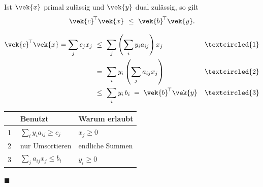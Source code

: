 \begin{merksatz}
Ist $\vek{x}$ primal zulässig und $\vek{y}$ dual zulässig, so gilt
\[ \vek{c}^{\!\top}\vek{x} \ \le\ \vek{b}^{\!\top}\vek{y} . \]

\begin{align*}
\vek{c}^{\!\top}\vek{x} = \sum_j c_j x_j
&\ \le\ \sum_j\left(\sum_i y_i a_{ij}\right)x_j && \textcircled{1}\\
&\ =\ \sum_i y_i\left(\sum_j a_{ij}x_j\right) && \textcircled{2}\\
&\ \le\ \sum_i y_i\,b_i \;=\; \vek{b}^{\!\top}\vek{y} && \textcircled{3}
\end{align*}

\begin{center}
{\small
\renewcommand{\arraystretch}{1.52}
\begin{tabular}{@{}P{1.2cm}P{3.0cm}P{3.6cm}@{}}
\toprule
& \textbf{Benutzt} & \textbf{Warum erlaubt}\\
\midrule
\textcircled{1} & $\sum_i y_ia_{ij}\ge c_j$ & $x_j \ge 0$\\
\textcircled{2} & nur Umsortieren & endliche Summen\\
\textcircled{3} & $\sum_j a_{ij}x_j \le b_i$ & $y_i \ge 0$\\
\bottomrule
\end{tabular}}
\end{center}
$\blacksquare$

\begin{center}
\begin{minipage}{0.88\textwidth}
\end{minipage}
\end{center}
\end{merksatz}

